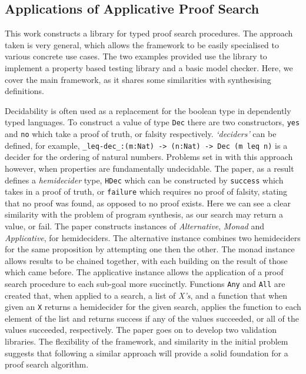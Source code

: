 \documentclass[a4paper]{article}
\begin{document}
\subsection{Applications of Applicative Proof Search}
\label{sec:org3140110}
This work constructs a library for typed proof search procedures. The approach taken is very general, which allows the 
framework to be easily specialised to various concrete use cases. The two examples provided use the library to implement a 
property based testing library and a basic model checker. Here, we cover the main framework, as it shares some similarities 
with synthesising definitions. 

Decidability is often used as a replacement for the boolean type in dependently typed languages. To construct a value of type 
\texttt{Dec} there are two constructors, \texttt{yes} and \texttt{no} which take a proof of truth, or falsity respectively. \emph{`deciders'} can be defined, 
for example, \texttt{\_leq-dec\_:(m:Nat) -> (n:Nat) -> Dec (m leq n)} is a decider for the ordering of natural numbers.
Problems set in with this approach however, when properties are fundamentally undecidable. The paper, as a result defines
a \emph{hemidecider} type, \texttt{HDec} which can be constructed by \texttt{success} which takes in a proof of truth, or \texttt{failure} which
requires no proof of falsity, stating that no proof was found, as opposed to no proof exists. 
Here we can see a clear similarity with the problem of program synthesis, as our search may return a value, or fail.
The paper constructs instances of \emph{Alternative}, \emph{Monad} and \emph{Applicative}, for hemideciders. The alternative instance combines
two hemideciders for the same proposition by attempting one then the other. The monad instance allows results to be 
chained together, with each building on the result of those which came before. The applicative instance allows the application
of a proof search procedure to each sub-goal more succinctly. Functions \texttt{Any} and \texttt{All} are created that, when applied to a 
search, a list of \emph{X's}, and a function that when given an \texttt{X} returns a hemidecider for the given search, applies the 
function to each element of the list and returns success if any of the values succeeded, or all of the values succeeded, respectively. 
The paper goes on to develop two validation libraries. The flexibility of the framework, and similarity in the initial problem 
suggests that following a similar approach will provide a solid foundation for a proof search algorithm.
\end{document}
